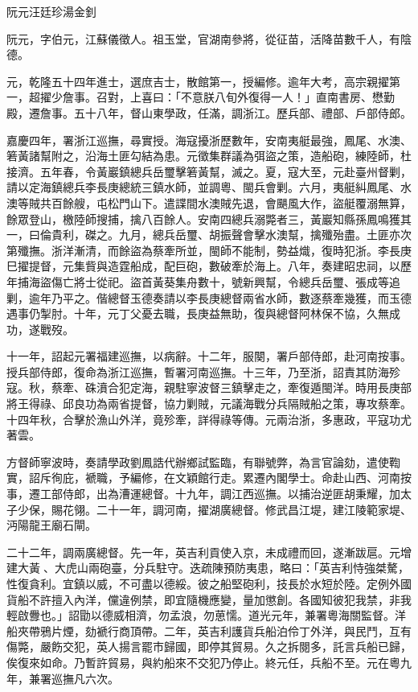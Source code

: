 
\begin{pinyinscope}
阮元汪廷珍湯金釗

阮元，字伯元，江蘇儀徵人。祖玉堂，官湖南參將，從征苗，活降苗數千人，有陰德。

元，乾隆五十四年進士，選庶吉士，散館第一，授編修。逾年大考，高宗親擢第一，超擢少詹事。召對，上喜曰：「不意朕八旬外復得一人！」直南書房、懋勤殿，遷詹事。五十八年，督山東學政，任滿，調浙江。歷兵部、禮部、戶部侍郎。

嘉慶四年，署浙江巡撫，尋實授。海寇擾浙歷數年，安南夷艇最強，鳳尾、水澳、箬黃諸幫附之，沿海土匪勾結為患。元徵集群議為弭盜之策，造船砲，練陸師，杜接濟。五年春，令黃巖鎮總兵岳璽擊箬黃幫，滅之。夏，寇大至，元赴臺州督剿，請以定海鎮總兵李長庚總統三鎮水師，並調粵、閩兵會剿。六月，夷艇糾鳳尾、水澳等賊共百餘艘，屯松門山下。遣諜間水澳賊先退，會颶風大作，盜艇覆溺無算，餘眾登山，檄陸師搜捕，擒八百餘人。安南四總兵溺斃者三，黃巖知縣孫鳳鳴獲其一，曰倫貴利，磔之。九月，總兵岳璽、胡振聲會擊水澳幫，擒殲殆盡。土匪亦次第殲撫。浙洋漸清，而餘盜為蔡牽所並，閩師不能制，勢益熾，復時犯浙。李長庚巳擢提督，元集貲與造霆船成，配巨砲，數破牽於海上。八年，奏建昭忠祠，以歷年捕海盜傷亡將士從祀。盜首黃葵集舟數十，號新興幫，令總兵岳璽、張成等追剿，逾年乃平之。偕總督玉德奏請以李長庚總督兩省水師，數逐蔡牽幾獲，而玉德遇事仍掣肘。十年，元丁父憂去職，長庚益無助，復與總督阿林保不協，久無成功，遂戰歿。

十一年，詔起元署福建巡撫，以病辭。十二年，服闋，署戶部侍郎，赴河南按事。授兵部侍郎，復命為浙江巡撫，暫署河南巡撫。十三年，乃至浙，詔責其防海殄寇。秋，蔡牽、硃濆合犯定海，親駐寧波督三鎮擊走之，牽復遁閩洋。時用長庚部將王得祿、邱良功為兩省提督，協力剿賊，元議海戰分兵隔賊船之策，專攻蔡牽。十四年秋，合擊於漁山外洋，竟殄牽，詳得祿等傳。元兩治浙，多惠政，平寇功尤著雲。

方督師寧波時，奏請學政劉鳳誥代辦鄉試監臨，有聯號弊，為言官論劾，遣使鞫實，詔斥徇庇，褫職，予編修，在文穎館行走。累遷內閣學士。命赴山西、河南按事，遷工部侍郎，出為漕運總督。十九年，調江西巡撫。以捕治逆匪胡秉耀，加太子少保，賜花翎。二十一年，調河南，擢湖廣總督。修武昌江堤，建江陵範家堤、沔陽龍王廟石閘。

二十二年，調兩廣總督。先一年，英吉利貢使入京，未成禮而回，遂漸跋扈。元增建大黃、大虎山兩砲臺，分兵駐守。迭疏陳預防夷患，略曰：「英吉利恃強桀驁，性復貪利。宜鎮以威，不可盡以德綏。彼之船堅砲利，技長於水短於陸。定例外國貨船不許擅入內洋，儻違例禁，即宜隨機應變，量加懲創。各國知彼犯我禁，非我輕啟釁也。」詔勖以德威相濟，勿孟浪，勿葸懦。道光元年，兼署粵海關監督。洋船夾帶鴉片煙，劾褫行商頂帶。二年，英吉利護貨兵船泊伶丁外洋，與民鬥，互有傷斃，嚴飭交犯，英人揚言罷市歸國，即停其貿易。久之拆閱多，託言兵船已歸，俟復來如命。乃暫許貿易，與約船來不交犯乃停止。終元任，兵船不至。元在粵九年，兼署巡撫凡六次。


\end{pinyinscope}
